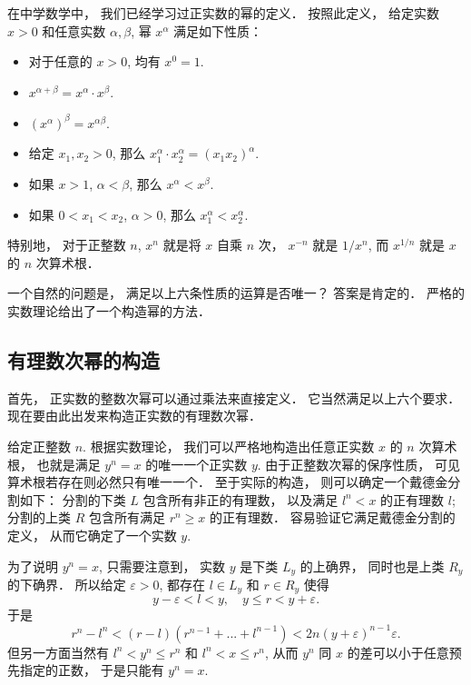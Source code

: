 

在中学数学中， 我们已经学习过正实数的幂的定义． 按照此定义， 给定实数$x>0$ 和任意实数 $\alpha,\beta$, 幂 $x^\alpha$ 满足如下性质：

\begin{itemize}
\item 对于任意的 $x>0$, 均有 $x^0=1$.
\item $x^{\alpha+\beta}=x^\alpha\cdot x^\beta$.
\item $(x^\alpha)^\beta=x^{\alpha\beta}$.
\item 给定 $x_1,x_2>0$, 那么 $x_1^\alpha\cdot x_2^\alpha=(x_1x_2)^\alpha$.
\item 如果 $x>1$, $\alpha<\beta$, 那么 $x^\alpha<x^\beta$.
\item 如果 $0<x_1<x_2$, $\alpha>0$, 那么 $x_1^\alpha<x_2^\alpha$.
\end{itemize}

特别地， 对于正整数 $n$, $x^n$ 就是将 $x$ 自乘 $n$ 次， $x^{-n}$ 就是 $1/x^n$, 而 $x^{1/n}$ 就是 $x$ 的 $n$ 次算术根． 

一个自然的问题是， 满足以上六条性质的运算是否唯一？ 答案是肯定的． 严格的实数理论给出了一个构造幂的方法．

\subsection{有理数次幂的构造}

首先， 正实数的整数次幂可以通过乘法来直接定义． 它当然满足以上六个要求． 现在要由此出发来构造正实数的有理数次幂．

给定正整数 $n$. 根据实数理论， 我们可以严格地构造出任意正实数 $x$ 的 $n$ 次算术根， 也就是满足 $y^n=x$ 的唯一一个正实数 $y$. 由于正整数次幂的保序性质， 可见算术根若存在则必然只有唯一一个． 至于实际的构造， 则可以确定一个戴德金分割如下： 分割的下类 $L$ 包含所有非正的有理数， 以及满足 $l^n<x$ 的正有理数 $l$; 分割的上类 $R$ 包含所有满足 $r^n\geq x$ 的正有理数． 容易验证它满足戴德金分割的定义， 从而它确定了一个实数 $y$. 

为了说明 $y^n=x$, 只需要注意到， 实数 $y$ 是下类 $L_y$ 的上确界， 同时也是上类 $R_y$ 的下确界． 所以给定 $\varepsilon>0$, 都存在 $l\in L_y$ 和 $r\in R_y$ 使得
\[
y-\varepsilon<l<y,\quad y\leq r<y+\varepsilon.
\]
于是
\[ 
r^n-l^n<(r-l)(r^{n-1}+...+l^{n-1})
<2n(y+\varepsilon)^{n-1}\varepsilon.
\]
但另一方面当然有 $l^n<y^n\leq r^n$ 和 $l^n<x\leq r^n$, 从而 $y^n$ 同 $x$ 的差可以小于任意预先指定的正数， 于是只能有 $y^n=x$.

